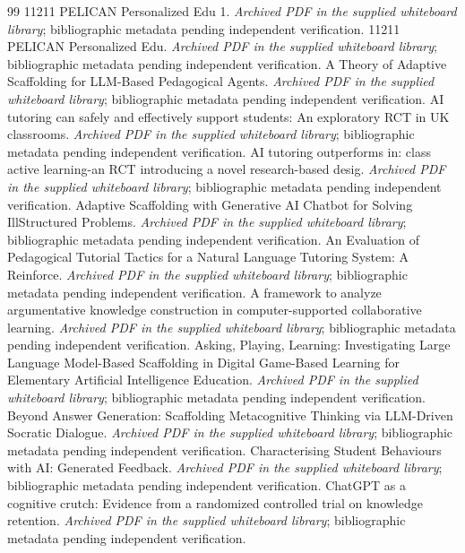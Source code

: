 \begin{thebibliography}{99}
\small
{} 11211 PELICAN Personalized Edu 1. \emph{Archived PDF in the supplied whiteboard library}; bibliographic metadata pending independent verification.
 11211 PELICAN Personalized Edu. \emph{Archived PDF in the supplied whiteboard library}; bibliographic metadata pending independent verification.
 A Theory of Adaptive Scaffolding for LLM-Based Pedagogical Agents. \emph{Archived PDF in the supplied whiteboard library}; bibliographic metadata pending independent verification.
 AI tutoring can safely and effectively support students: An exploratory RCT in UK classrooms. \emph{Archived PDF in the supplied whiteboard library}; bibliographic metadata pending independent verification.
 AI tutoring outperforms in: class active learning-an RCT introducing a novel research-based desig. \emph{Archived PDF in the supplied whiteboard library}; bibliographic metadata pending independent verification.
 Adaptive Scaffolding with Generative AI Chatbot for Solving IllStructured Problems. \emph{Archived PDF in the supplied whiteboard library}; bibliographic metadata pending independent verification.
 An Evaluation of Pedagogical Tutorial Tactics for a Natural Language Tutoring System: A Reinforce. \emph{Archived PDF in the supplied whiteboard library}; bibliographic metadata pending independent verification.
 A framework to analyze argumentative knowledge construction in computer-supported collaborative learning. \emph{Archived PDF in the supplied whiteboard library}; bibliographic metadata pending independent verification.
 Asking, Playing, Learning: Investigating Large Language Model-Based Scaffolding in Digital Game-Based Learning for Elementary Artificial Intelligence Education. \emph{Archived PDF in the supplied whiteboard library}; bibliographic metadata pending independent verification.
 Beyond Answer Generation: Scaffolding Metacognitive Thinking via LLM-Driven Socratic Dialogue. \emph{Archived PDF in the supplied whiteboard library}; bibliographic metadata pending independent verification.
 Characterising Student Behaviours with AI: Generated Feedback. \emph{Archived PDF in the supplied whiteboard library}; bibliographic metadata pending independent verification.
 ChatGPT as a cognitive crutch: Evidence from a randomized controlled trial on knowledge retention. \emph{Archived PDF in the supplied whiteboard library}; bibliographic metadata pending independent verification.

\end{thebibliography}
